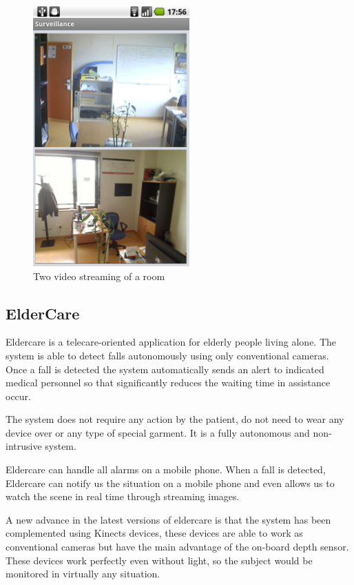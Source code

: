 \documentclass[twocolumn]{svjour3}          %
\begin{document}
\begin{figure}
\includegraphics[width=6cm]{figs/surveillance-streaming2-recording.png}
\caption{Two video streaming of a room}
\label{fig:surveillance3}
\end{figure}


\subsection{ElderCare}
Eldercare is a telecare-oriented application for elderly people living alone. The system is able to detect falls autonomously using only conventional cameras. Once a fall is detected the system automatically sends an alert to indicated medical personnel so that significantly reduces the waiting time in assistance occur.

The system does not require any action by the patient, do not need to wear any device over or any type of special  garment. It is a fully autonomous and non-intrusive system.

Eldercare can handle all alarms on a mobile phone. When a fall is detected, Eldercare can notify us the situation on a mobile phone and even allows us to watch the scene in real time through streaming images.

A new advance in the latest versions of eldercare is that the system has been complemented using Kinects devices, these devices are able to work as conventional cameras but have the main advantage of the on-board depth sensor. These devices work perfectly even without light, so the subject would be monitored in virtually any situation. 
\end{document}
